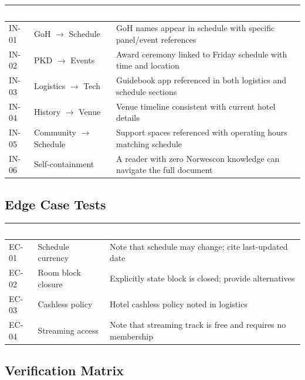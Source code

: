 \documentclass[11pt,letterpaper]{article}
\newcommand{\tableheader}[1]{\textbf{\sffamily\textcolor{white}{#1}}}
\begin{document}
\begin{center}
\begin{tabularx}{\textwidth}{C{1.2cm}L{3cm}X}
\toprule
{}
\tableheader{ID} & \tableheader{Verifies} & \tableheader{Expected Behavior} \\
\midrule
IN-01 & GoH $\rightarrow$ Schedule & GoH names appear in schedule with specific panel/event references \\
IN-02 & PKD $\rightarrow$ Events & Award ceremony linked to Friday schedule with time and location \\
IN-03 & Logistics $\rightarrow$ Tech & Guidebook app referenced in both logistics and schedule sections \\
IN-04 & History $\rightarrow$ Venue & Venue timeline consistent with current hotel details \\
IN-05 & Community $\rightarrow$ Schedule & Support spaces referenced with operating hours matching schedule \\
IN-06 & Self-containment & A reader with zero Norwescon knowledge can navigate the full document \\
\bottomrule
\end{tabularx}
\end{center}

\subsection{Edge Case Tests}

\begin{center}
\begin{tabularx}{\textwidth}{C{1.2cm}L{3cm}X}
\toprule
{}
\tableheader{ID} & \tableheader{Verifies} & \tableheader{Expected Behavior} \\
\midrule
EC-01 & Schedule currency & Note that schedule may change; cite last-updated date \\
EC-02 & Room block closure & Explicitly state block is closed; provide alternatives \\
EC-03 & Cashless policy & Hotel cashless policy noted in logistics \\
EC-04 & Streaming access & Note that streaming track is free and requires no membership \\
\bottomrule
\end{tabularx}
\end{center}

\subsection{Verification Matrix}
\end{document}
